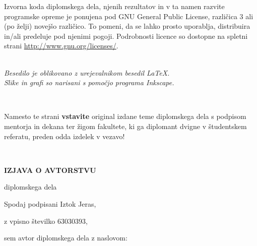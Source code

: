 \documentclass[12pt,a4paper,openany,twoside]{book}
\begin{document}
\vspace*{1.5cm}
{\small \noindent
Izvorna koda diplomskega dela, njenih rezultatov in v ta namen razvite programske opreme je ponujena pod GNU General Public License,
različica 3 ali (po želji) novejšo različico. To pomeni, da se lahko prosto uporablja, distribuira in/ali predeluje pod njenimi pogoji.
Podrobnosti licence so dostopne na spletni strani \url{http://www.gnu.org/licenses/}.
}

\begin{center} 
\ \\ \vfill
{\em Besedilo je oblikovano z urejevalnikom besedil \LaTeX.\\
Slike in grafi so narisani s pomočjo programa Inkscape.}
\end{center}

\newpage
\ \thispagestyle{empty}
\newpage

\thispagestyle{empty}

Namesto te strani {\bf vstavite} original izdane teme diplomskega dela s podpisom mentorja in dekana ter žigom fakultete, ki ga diplomant
dvigne v študent\-skem referatu,  preden odda izdelek v vezavo!

\newpage


\ \thispagestyle{empty}

\newpage



\thispagestyle{empty}

\vspace{1cm}
\begin{center} 
{\Large \textbf{IZJAVA O AVTORSTVU}}
\end{center}

\begin{center} 
{\Large diplomskega dela}
\end{center}

\vspace{1cm}
Spodaj podpisani \hspace{0.5cm} Iztok Jeras,

\vspace{0.5cm}
z vpisno številko \hspace{0.5cm} 63030393,

\vspace{1cm}
sem avtor diplomskega dela z naslovom:
   
\end{document}
